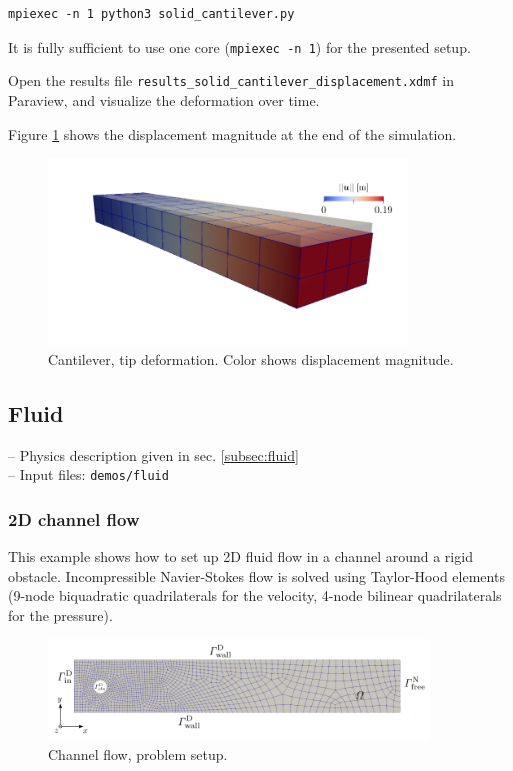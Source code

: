 \documentclass[a4paper,12pt]{report}
\begin{document}
\begin{verbatim}
mpiexec -n 1 python3 solid_cantilever.py
\end{verbatim}

It is fully sufficient to use one core (\verb"mpiexec -n 1") for the presented setup.

Open the results file \verb"results_solid_cantilever_displacement.xdmf" in Paraview, and visualize the deformation over time.

Figure \ref{fig:cantilever_results} shows the displacement magnitude at the end of the simulation.

\begin{figure}
\centering
\includegraphics[width=0.85\textwidth]{fig/cantilever_results.png}
\caption{Cantilever, tip deformation. Color shows displacement magnitude.}
\label{fig:cantilever_results}
\end{figure}


\subsection{Fluid}\label{subsec:demos:fluid}

-- Physics description given in sec. \ref{subsec:fluid}\\

-- Input files: \verb"demos/fluid"

\subsubsection*{2D channel flow}

This example shows how to set up 2D fluid flow in a channel around a rigid obstacle. Incompressible Navier-Stokes flow is solved using Taylor-Hood elements
(9-node biquadratic quadrilaterals for the velocity, 4-node bilinear quadrilaterals for the pressure).

\begin{figure}
\centering
\includegraphics[width=0.9\textwidth]{fig/channel_setup.png}
\caption{Channel flow, problem setup.}
\label{fig:channel_setup}
\end{figure}
\end{document}
